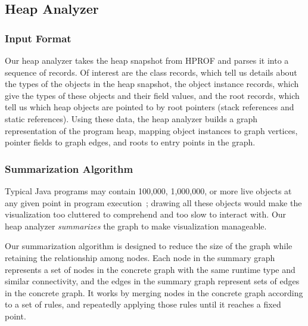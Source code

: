 

\subsection{Heap Analyzer}

\subsubsection{Input Format}

Our heap analyzer takes the heap snapshot from HPROF and parses it into
a sequence of records.  Of interest are the class records, which tell us
details about the types of the objects in the heap snapshot, the object 
instance records, which give the types of these objects and their field values,
and the root records, which tell us which heap objects are pointed to by
root pointers (stack references and static references).  Using these data,
the heap analyzer builds a graph representation of the program heap, mapping
object instances to graph vertices, pointer fields to graph edges, and roots
to entry points in the graph.  

\subsubsection{Summarization Algorithm}

Typical Java programs may contain 100,000, 1,000,000, or more live objects at any 
given point in program execution~\cite{blackburn06dacapo}; drawing
all these objects would make the visualization too cluttered to comprehend 
and too slow to interact with.  Our heap analyzer \emph{summarizes} 
the graph to make visualization manageable.  

Our summarization algorithm is designed to reduce the size of the graph 
while retaining the relationship among nodes.  Each node in the summary graph
represents a set of nodes in the concrete graph with the same runtime type 
and similar connectivity, and the edges in the summary graph represent
sets of edges in the concrete graph.  It works by merging nodes in the 
concrete graph according to a set of rules, and repeatedly applying those
rules until it reaches a fixed point.

